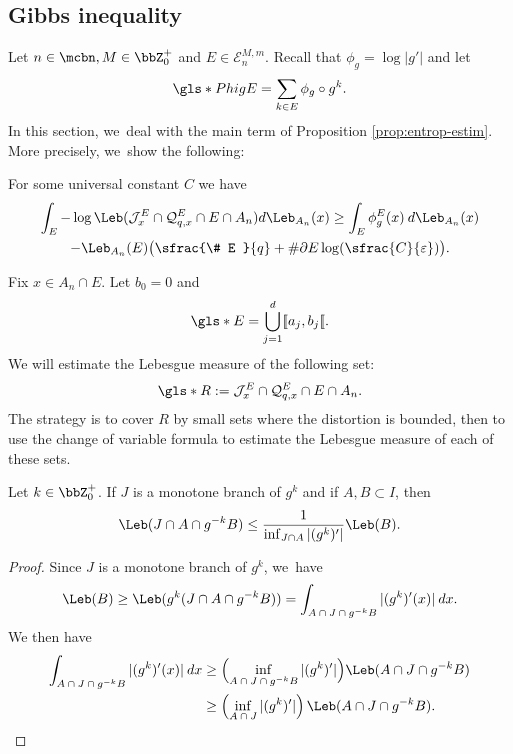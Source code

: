 \subsection{Gibbs inequality}
\label{ssec:gibbs}

Let $n \in \mcbn, M \in \bbZ_0^+$ and $E \in \mathcal{E}_n^{M,m}$. Recall that $\phi_g = \log |g'|$ and let
\[
\gls*{PhigE} = \sum_{k \in E} \phi_g \circ g^k.
\]
In this section, we~deal with the main term of Proposition \ref{prop:entrop-estim}.
More precisely, we~show the following:

\begin{prop}
\label{prop:Gibbs}
For some universal constant $C$ we have
\begin{multline*}
\int_E - \log \Leb(\mathcal{J}^E_x \cap \mathcal{Q}_{q,x}^E \cap E \cap A_n) d \Leb_{A_n}(x)
\geq \int_E \phi_g^E(x) \: d \Leb_{A_n}(x)\\
- \Leb_{A_n}(E) \bigl (\sfrac{\# E }{q} + \# \partial E \log (\sfrac{C}{\varepsilon}) \bigr).
\end{multline*}
\end{prop}

Fix $x \in A_n \cap E$. Let $b_0 = 0$ and
\[
\gls*{E} = \bigcup_{j = 1}^d [\![ a_j, b_j [\![.
\]
We will estimate the Lebesgue measure of the following set:
\[
\gls*{R} := \mathcal{J}^E_x \cap \mathcal{Q}_{q,x}^{E} \cap E \cap A_n.
\]
The strategy is to cover $R$ by small sets where the distortion is bounded, then to use the change of variable formula to estimate the Lebesgue measure of each of these sets.

\begin{lem}
\label{lem:chgt-var}
Let $k \in \bbZ_0^+$. If $J$ is a monotone branch of $g^k$ and if $A,B \subset I$, then
\[
\Leb(J \cap A \cap g^{-k} B) \leq \frac{1}{\inf_{J \cap A} |(g^k)'|} \Leb(B).
\]
\end{lem}
\begin{proof}
Since $J$ is a monotone branch of $g^k$, we~have
\[
\Leb(B) \geq \Leb(g^k(J \cap A \cap g^{-k} B)) = \int_{A \: \cap \: J \: \cap \: g^{-k} B} |(g^k)'(x)| \: dx.
\]
We then have
\begin{align*}
\int_{A \: \cap \: J \: \cap \: g^{-k} B} |(g^k)'(x)| \: dx
&\geq \Bigl (\inf_{A \: \cap \: J \: \cap \: g^{-k} B} |(g^k)'| \Bigr) \Leb(A \cap J \cap g^{-k} B)\\
&\geq \left (\inf_{A \: \cap \: J} |(g^k)'| \right) \Leb(A \cap J \cap g^{-k} B).\qedhere
\end{align*}
\end{proof}

